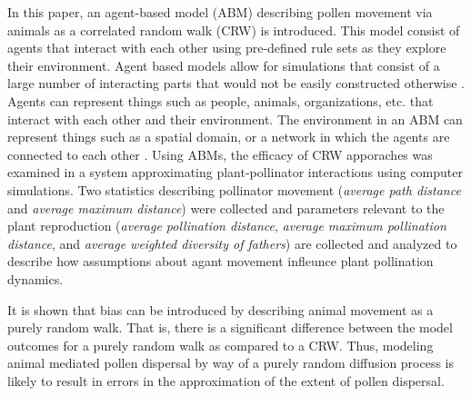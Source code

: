 In this paper, an agent-based model (ABM) describing pollen movement via animals
as a correlated random walk (CRW) is introduced. This model consist of agents
that interact with each other using pre-defined rule sets as they explore their
environment. Agent based models allow for simulations that consist of a large
number of interacting parts that would not be easily constructed otherwise
\cite{Fioretti05}. Agents can represent things such as people, animals,
organizations, etc. that interact with each other and their environment. The
environment in an ABM can represent things such as a spatial domain, or a
network in which the agents are connected to each other \cite{Gilbert}. Using
ABMs, the efficacy of CRW apporaches was examined in a system approximating
plant-pollinator interactions using computer simulations. Two statistics
describing pollinator movement (\emph{average path distance} and \emph{average
maximum distance}) were collected and parameters relevant to the plant
reproduction (\emph{average pollination distance}, \emph{average maximum
pollination distance}, and \emph{average weighted diversity of fathers}) are
collected and analyzed to describe how assumptions about agant movement
infleunce plant pollination dynamics.

It is shown that bias can be introduced by describing animal movement as a
purely random walk. That is, there is a significant difference between the model
outcomes for a purely random walk as compared to a CRW. Thus, modeling animal
mediated pollen dispersal by way of a purely random diffusion process is likely
to result in errors in the approximation of the extent of pollen dispersal.
